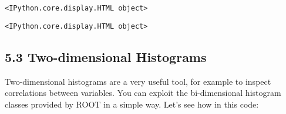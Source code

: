 \documentclass{article}
\begin{document}
    
    \begin{verbatim}
<IPython.core.display.HTML object>
    \end{verbatim}

    
    
    \begin{verbatim}
<IPython.core.display.HTML object>
    \end{verbatim}

    
    \subsection{5.3 Two-dimensional
Histograms}\label{two-dimensional-histograms}

Two-dimensional histograms are a very useful tool, for example to
inspect correlations between variables. You can exploit the
bi-dimensional histogram classes provided by ROOT in a simple way. Let's
see how in this code:
\end{document}
